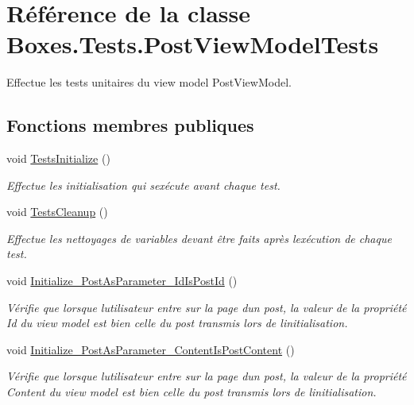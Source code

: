 \hypertarget{class_boxes_1_1_tests_1_1_post_view_model_tests}{}\section{Référence de la classe Boxes.\+Tests.\+Post\+View\+Model\+Tests}
\label{class_boxes_1_1_tests_1_1_post_view_model_tests}


Effectue les tests unitaires du view model Post\+View\+Model.  


\subsection*{Fonctions membres publiques}
\begin{DoxyCompactItemize}
\item 
void \hyperlink{class_boxes_1_1_tests_1_1_post_view_model_tests_afee98220ef99da8e624ff037546b6a76}{Tests\+Initialize} ()
\begin{DoxyCompactList}\small\item\em Effectue les initialisation qui s\textquotesingle{}exécute avant chaque test. \end{DoxyCompactList}\item 
void \hyperlink{class_boxes_1_1_tests_1_1_post_view_model_tests_a438eed6beaf7f9ed08466a605ad16542}{Tests\+Cleanup} ()
\begin{DoxyCompactList}\small\item\em Effectue les nettoyages de variables devant être faits après l\textquotesingle{}exécution de chaque test. \end{DoxyCompactList}\item 
void \hyperlink{class_boxes_1_1_tests_1_1_post_view_model_tests_a73653ceaf32499c3e27f957614fe9d88}{Initialize\+\_\+\+Post\+As\+Parameter\+\_\+\+Id\+Is\+Post\+Id} ()
\begin{DoxyCompactList}\small\item\em Vérifie que lorsque l\textquotesingle{}utilisateur entre sur la page d\textquotesingle{}un post, la valeur de la propriété {\ttfamily Id} du view model est bien celle du post transmis lors de l\textquotesingle{}initialisation. \end{DoxyCompactList}\item 
void \hyperlink{class_boxes_1_1_tests_1_1_post_view_model_tests_a8afd4b31c3571b6fccb954a9d637a321}{Initialize\+\_\+\+Post\+As\+Parameter\+\_\+\+Content\+Is\+Post\+Content} ()
\begin{DoxyCompactList}\small\item\em Vérifie que lorsque l\textquotesingle{}utilisateur entre sur la page d\textquotesingle{}un post, la valeur de la propriété {\ttfamily Content} du view model est bien celle du post transmis lors de l\textquotesingle{}initialisation. \end{DoxyCompactList}\item 

\end{DoxyCompactItemize}
